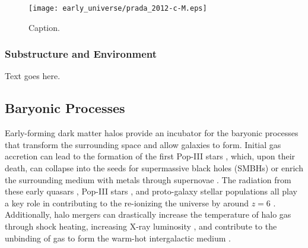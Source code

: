 \begin{figure}[ht]
	\centering
	\texttt{[image: early\_universe/prada\_2012-c-M.eps]}
	\caption[Caption]{\footnotesize Caption.}
	\label{fig:concentration--prada_c_M}
\end{figure}



\subsubsection{Substructure and Environment}
\label{subsubsec:early_universe--halo_properties--structure}


Text goes here.




\subsection{Baryonic Processes}
\label{subsec:early_universe--baryonic_processes}


Early-forming dark matter halos provide an incubator for the baryonic processes that transform the surrounding space and allow galaxies to form.  Initial gas accretion can lead to the formation of the first Pop-III stars \citep{1986MNRAS.221...53C, 1997ApJ...474....1T, 2000ApJ...540...39A, 2002Sci...295...93A}, which, upon their death, can collapse into the seeds for supermassive black holes (SMBHs) \citep{2001ApJ...551L..27M, 2003MNRAS.340..647I, 2009ApJ...701L.133A, 2012ApJ...754...34J} or enrich the surrounding medium with metals through supernovae \citep{2002ApJ...567..532H, 2003ApJ...591..288H}.  The radiation from these early quasars \citep{1987ApJ...321L.107S, 1999ApJ...514..648M, 2001AJ....122.2833F}, Pop-III stars \citep{1997ApJ...486..581G, 2003ApJ...584..621V, 2006ApJ...639..621A}, and proto-galaxy stellar populations \citep{2012ApJ...752L...5B, 2012MNRAS.423..862K} all play a key role in contributing to the re-ionizing the universe by around $z = 6$ \citep{2001PhR...349..125B}.  Additionally, halo mergers can drastically increase the temperature of halo gas through shock heating, increasing X-ray luminosity \citep{2009MNRAS.397..190S}, and contribute to the unbinding of gas to form the warm-hot intergalactic medium \citep{2008SSRv..134..141B, 2010MNRAS.405L..31S, 2012MNRAS.425.2974T}.



